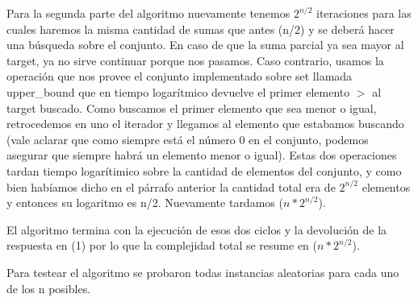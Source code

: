 Para la segunda parte del algoritmo nuevamente tenemos $2 ^{n/2}$ iteraciones para las cuales haremos la misma cantidad de sumas que antes (n/2) y se deberá hacer una búsqueda sobre el conjunto. En caso de que la suma parcial ya sea mayor al target, ya no sirve continuar porque nos pasamos. Caso contrario, usamos la operación que nos provee el conjunto implementado sobre set llamada upper_bound que en tiempo logarítmico devuelve el primer elemento $>$ al target buscado. Como buscamos el primer elemento que sea menor o igual, retrocedemos en uno el iterador y llegamos al elemento que estabamos buscando (vale aclarar que como siempre está el número 0 en el conjunto, podemos asegurar que siempre habrá un elemento menor o igual). Estas dos operaciones tardan tiempo logarítimico sobre la cantidad de elementos del conjunto, y como bien habíamos dicho en el párrafo anterior la cantidad total era de $2 ^{n/2}$ elementos y entonces su logaritmo es n/2. Nuevamente tardamos \bigo($n * 2 ^{n/2}$).

El algoritmo termina con la ejecución de esos dos ciclos y la devolución de la respuesta en \bigo(1) por lo que la complejidad total se resume en \bigo($n * 2 ^{n/2}$).

Para testear el algoritmo se probaron todas instancias aleatorias para cada uno de los n posibles.
